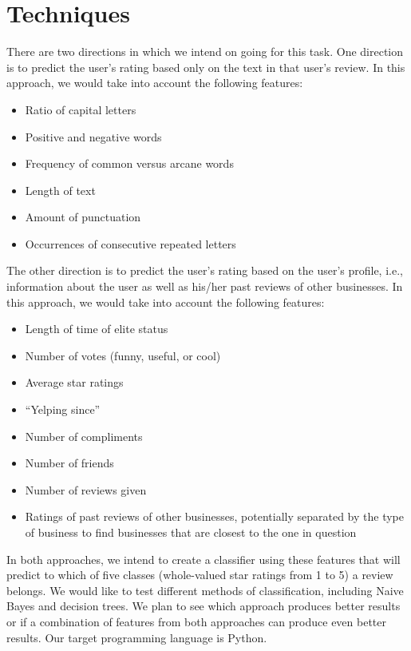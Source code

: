 \documentclass[12pt]{article}
\begin{document}
\section*{Techniques}
There are two directions in which we intend on going for this task. One direction is to predict the user's rating based only on the text in that user's review. In this approach, we would take into account the following features:
\begin{itemize}
\item
Ratio of capital letters

\item
Positive and negative words

\item
Frequency of common versus arcane words

\item
Length of text

\item
Amount of punctuation

\item
Occurrences of consecutive repeated letters
\end{itemize}
The other direction is to predict the user's rating based on the user's profile, i.e., information about the user as well as his/her past reviews of other businesses. In this approach, we would take into account the following features:
\begin{itemize}
\item
Length of time of elite status

\item
Number of votes (funny, useful, or cool)

\item
Average star ratings

\item
``Yelping since''

\item
Number of compliments

\item
Number of friends

\item
Number of reviews given

\item
Ratings of past reviews of other businesses, potentially separated by the type of business to find businesses that are closest to the one in question
\end{itemize}
In both approaches, we intend to create a classifier using these features that will predict to which of five classes (whole-valued star ratings from 1 to 5) a review belongs. We would like to test different methods of classification, including Naive Bayes and decision trees. We plan to see which approach produces better results or if a combination of features from both approaches can produce even better results. Our target programming language is Python.
\end{document}
